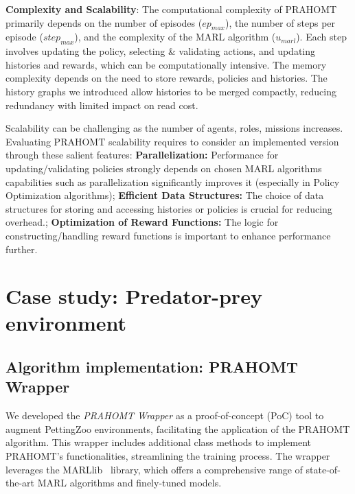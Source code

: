 \documentclass[runningheads]{llncs}
\theoremstyle{freethm}
\theoremstyle{proofoutline}
\newcounter{proof}
\begin{document}
\textbf{Complexity and Scalability}: \quad The computational complexity of PRAHOMT primarily depends on the number of episodes ($ep_{max}$), the number of steps per episode ($step_{max}$), and the complexity of the MARL algorithm ($u_{marl}$). Each step involves updating the policy, selecting \& validating actions, and updating histories and rewards, which can be computationally intensive. The memory complexity depends on the need to store rewards, policies and histories. The history graphs we introduced allow histories to be merged compactly, reducing redundancy with limited impact on read cost.

Scalability can be challenging as the number of agents, roles, missions increases. Evaluating PRAHOMT scalability requires to consider an implemented version through these salient features: \quad
\textbf{Parallelization:} Performance for updating/validating policies strongly depends on chosen MARL algorithms capabilities such as parallelization significantly improves it (especially in Policy Optimization algorithms); \quad
\textbf{Efficient Data Structures:} The choice of data structures for storing and accessing histories or policies is crucial for reducing overhead.; \quad
\textbf{Optimization of Reward Functions:} The logic for constructing/handling reward functions is important to enhance performance further.




\section{Case study: Predator-prey environment}\label{sec:case_study}

\subsection{Algorithm implementation: PRAHOMT Wrapper}

We developed the \textit{PRAHOMT Wrapper}
%
%
as a proof-of-concept (PoC) tool to augment PettingZoo environments, facilitating the application of the PRAHOMT algorithm. This wrapper includes additional class methods to implement PRAHOMT's functionalities, streamlining the training process. The wrapper leverages the MARLlib~\cite{hu2022marllib} library, which offers a comprehensive range of state-of-the-art MARL algorithms and finely-tuned models.
\end{document}
